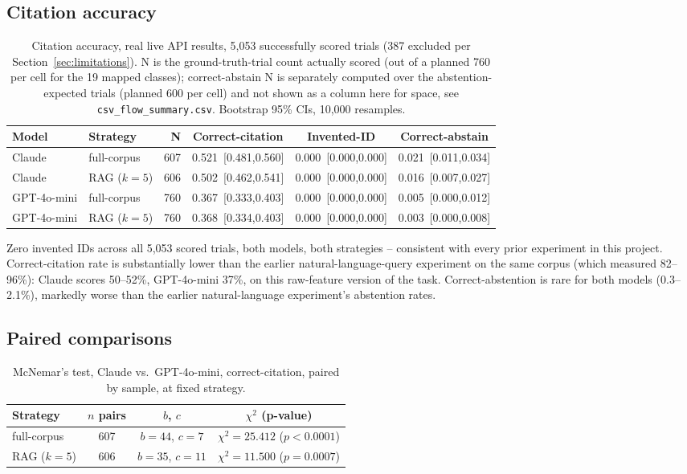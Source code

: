 \documentclass[11pt]{article}
\begin{document}
\subsection{Citation accuracy}

\begin{table}[h]
\centering
\small
\begin{tabular}{llrccc}
\toprule
\textbf{Model} & \textbf{Strategy} & \textbf{N} & \textbf{Correct-citation} & \textbf{Invented-ID} & \textbf{Correct-abstain} \\
\midrule
Claude & full-corpus & 607 & 0.521~[0.481,0.560] & 0.000~[0.000,0.000] & 0.021~[0.011,0.034] \\
Claude & RAG ($k{=}5$) & 606 & 0.502~[0.462,0.541] & 0.000~[0.000,0.000] & 0.016~[0.007,0.027] \\
GPT-4o-mini & full-corpus & 760 & 0.367~[0.333,0.403] & 0.000~[0.000,0.000] & 0.005~[0.000,0.012] \\
GPT-4o-mini & RAG ($k{=}5$) & 760 & 0.368~[0.334,0.403] & 0.000~[0.000,0.000] & 0.003~[0.000,0.008] \\
\bottomrule
\end{tabular}
\caption{Citation accuracy, real live API results, 5{,}053 successfully
scored trials (387 excluded per Section~\ref{sec:limitations}). N is the
ground-truth-trial count actually scored (out of a planned 760 per cell for
the 19 mapped classes); correct-abstain N is separately computed over the
abstention-expected trials (planned 600 per cell) and not shown as a
column here for space, see \texttt{csv\_flow\_summary.csv}. Bootstrap 95\%
CIs, 10{,}000 resamples.}
\label{tab:results-main}
\end{table}

Zero invented IDs across all 5{,}053 scored trials, both models, both
strategies -- consistent with every prior experiment in this project.
Correct-citation rate is substantially lower than the earlier
natural-language-query experiment on the same corpus (which measured
82--96\%): Claude scores 50--52\%, GPT-4o-mini 37\%, on this raw-feature
version of the task. Correct-abstention is rare for both models
(0.3--2.1\%), markedly worse than the earlier natural-language experiment's
abstention rates.

\subsection{Paired comparisons}

\begin{table}[h]
\centering
\small
\begin{tabular}{lccc}
\toprule
\textbf{Strategy} & \textbf{$n$ pairs} & \textbf{$b$, $c$} & \textbf{$\chi^2$ (p-value)} \\
\midrule
full-corpus & 607 & $b{=}44$, $c{=}7$ & $\chi^2{=}25.412$ ($p{<}0.0001$) \\
RAG ($k{=}5$) & 606 & $b{=}35$, $c{=}11$ & $\chi^2{=}11.500$ ($p{=}0.0007$) \\
\bottomrule
\end{tabular}
\caption{McNemar's test, Claude vs.\ GPT-4o-mini, correct-citation, paired
by sample, at fixed strategy.}
\label{tab:mcnemar-model}
\end{table}
\end{document}
